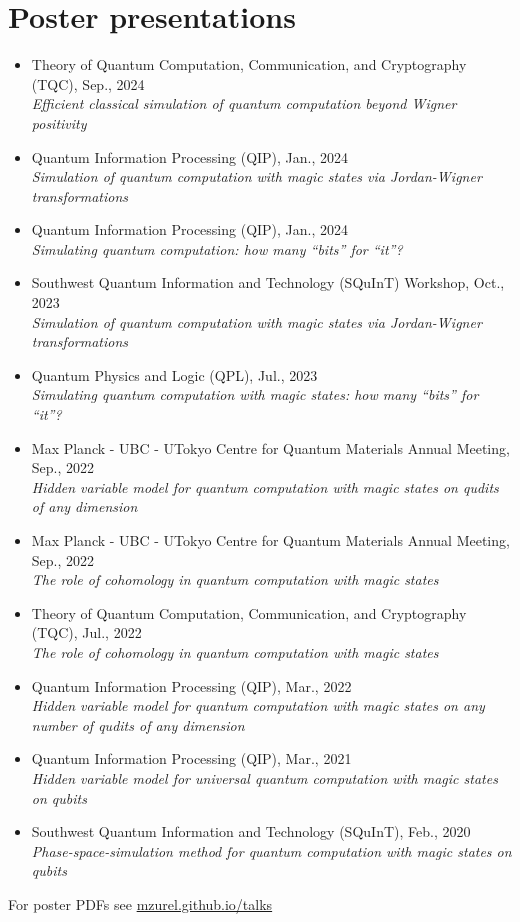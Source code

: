 \documentclass[letterpaper,11pt]{article}
\newcommand{\ConferenceItem}[3]{
	\item{\parbox{0.97\textwidth}{
		{#1}  \hfill {#2}\\
		\emph{#3}
	}}
}
\begin{document}
\section*{Poster presentations}
\begin{itemize}[leftmargin=*]
	\ConferenceItem{Theory of Quantum Computation, Communication, and Cryptography (TQC), Sep., 2024}{}{Efficient classical simulation of quantum computation beyond Wigner positivity}
	
	\ConferenceItem{Quantum Information Processing (QIP), Jan., 2024}{}{Simulation of quantum computation with magic states via Jordan-Wigner transformations}
	
	\ConferenceItem{Quantum Information Processing (QIP), Jan., 2024}{}{Simulating quantum computation: how many ``bits'' for ``it''?}
	
	\ConferenceItem{Southwest Quantum Information and Technology (SQuInT) Workshop, Oct., 2023}{}{Simulation of quantum computation with magic states via Jordan-Wigner transformations}
	
	\ConferenceItem{Quantum Physics and Logic (QPL), Jul., 2023}{}{Simulating quantum computation with magic states: how many ``bits'' for ``it''?}
	
	\ConferenceItem{Max Planck - UBC - UTokyo Centre for Quantum Materials Annual Meeting, Sep., 2022}{}{Hidden variable model for quantum computation with magic states on qudits of any dimension}
	
	\ConferenceItem{Max Planck - UBC - UTokyo Centre for Quantum Materials Annual Meeting, Sep., 2022}{}{The role of cohomology in quantum computation with magic states}
	
	\ConferenceItem{Theory of Quantum Computation, Communication, and Cryptography (TQC), Jul., 2022}{}{The role of cohomology in quantum computation with magic states}
	
	\ConferenceItem{Quantum Information Processing (QIP), Mar., 2022}{}{Hidden variable model for quantum computation with magic states on any number of qudits of any dimension}
	
	\ConferenceItem{Quantum Information Processing (QIP), Mar., 2021}{}{Hidden variable model for universal quantum computation with magic states on qubits}
	
	\ConferenceItem{Southwest Quantum Information and Technology (SQuInT), Feb., 2020}{}{Phase-space-simulation method for quantum computation with magic states on qubits}
\end{itemize}
For poster PDFs see \href{https://mzurel.github.io/talks}{mzurel.github.io/talks}
\end{document}

